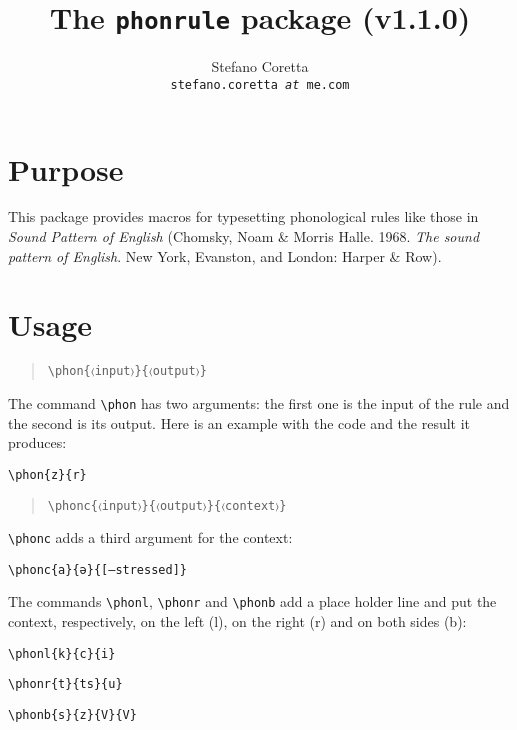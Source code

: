 \documentclass[a4paper]{article}
\title{The \texttt{phonrule} package (v1.1.0)}
\author{Stefano Coretta \\ \texttt{stefano.coretta \textit{at} me.com}}
\begin{document}
\maketitle

\section{Purpose}
This package provides macros for typesetting phonological rules like those in \textit{Sound Pattern of English} (Chomsky, Noam \& Morris Halle. 1968. \textit{The sound pattern of English}. New York, Evanston, and London: Harper \& Row).

\section{Usage}

\begin{quote}
\begin{verbatim}
\phon{〈input〉}{〈output〉}
\end{verbatim}
\end{quote}

The command \verb+\phon+ has two arguments: the first one is the input of the rule and the second is its output. Here is an example with the code and the result it produces:

\begin{exe}
\ex \verb+\phon{z}{r}+
\ex {}
\end{exe}

\begin{quote}
\begin{verbatim}
\phonc{〈input〉}{〈output〉}{〈context〉}
\end{verbatim}
\end{quote}

\verb+\phonc+ adds a third argument for the context:

\begin{exe}
\ex \verb+\phonc{a}{ə}{[–stressed]}+
\ex {}
\end{exe}

The commands \verb+\phonl+, \verb+\phonr+ and \verb+\phonb+ add a place holder line and put the context, respectively, on the left (l), on the right (r) and on both sides (b):

\begin{exe}
\ex
	\begin{xlist}
	\ex \verb+\phonl{k}{c}{i}+
	\ex {}
	\end{xlist}
\ex
	\begin{xlist}
	\ex \verb+\phonr{t}{ts}{u}+
	\ex \phonr{t}{ts}{u}
	\end{xlist}
\ex
	\begin{xlist}
	\ex \verb+\phonb{s}{z}{V}{V}+
	\ex \phonb{s}{z}{V}{V}
	\end{xlist}
\end{exe}
\end{document}
